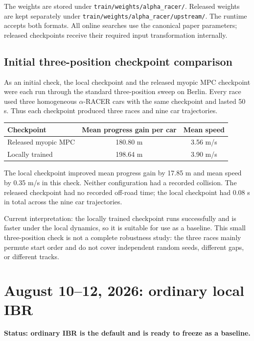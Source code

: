 \documentclass[11pt]{article}
\newcommand{\code}[1]{\texttt{#1}}
\newcommand{\status}[1]{\textcolor{blue!65!black}{\textbf{#1}}}
\begin{document}
The weights are stored under \code{train/weights/alpha\_racer/}. Released
weights are kept separately under \code{train/weights/alpha\_racer/upstream/}.
The runtime accepts both formats. All online searches use the canonical paper
parameters; released checkpoints receive their required input transformation
internally.

\subsection{Initial three-position checkpoint comparison}

As an initial check, the local checkpoint and the released myopic MPC checkpoint
were each run through the standard three-position sweep on Berlin. Every race
used three homogeneous $\alpha$-RACER cars with the same checkpoint and lasted
50 s. Thus each checkpoint produced three races and nine car trajectories.

\begin{center}
\small
\begin{tabular}{lcc}
\toprule
Checkpoint & Mean progress gain per car & Mean speed \\
\midrule
Released myopic MPC & 180.80 m & 3.56 m/s \\
Locally trained & 198.64 m & 3.90 m/s \\
\bottomrule
\end{tabular}
\end{center}

The local checkpoint improved mean progress gain by 17.85 m and mean speed by
0.35 m/s in this check. Neither configuration had a recorded collision. The
released checkpoint had no recorded off-road time; the local checkpoint had
0.08 s in total across the nine car trajectories.

Current interpretation: the locally trained checkpoint runs successfully and
is faster under the local dynamics, so it is suitable for use as a baseline.
This small three-position check is not a complete robustness study: the three
races mainly permute start order and do not cover independent random seeds,
different gaps, or different tracks.

\section{August 10--12, 2026: ordinary local IBR}

\status{Status: ordinary IBR is the default and is ready to freeze as a baseline.}
\end{document}
